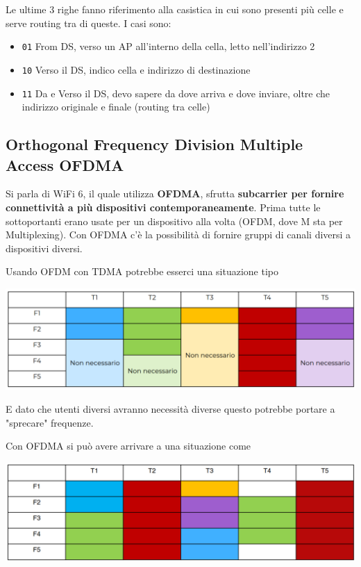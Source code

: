 Le ultime 3 righe fanno riferimento alla casistica in cui sono presenti più celle e serve routing tra di queste. I casi sono:
\begin{itemize}
	\item \texttt{01} From DS, verso un AP all'interno della cella, letto nell'indirizzo 2

	\item \texttt{10} Verso il DS, indico cella e indirizzo di destinazione

	\item \texttt{11} Da e Verso il DS, devo sapere da dove arriva e dove inviare, oltre che indirizzo originale e finale (routing tra celle)
\end{itemize}

\subsection{Orthogonal Frequency Division Multiple Access OFDMA}

Si parla di WiFi 6, il quale utilizza \textbf{OFDMA}, sfrutta \textbf{subcarrier per fornire connettività a più dispositivi contemporaneamente}. Prima tutte le sottoportanti erano usate per un dispositivo alla volta (OFDM, dove M sta per Multiplexing). Con OFDMA c'è la possibilità di fornire gruppi di canali diversi a dispositivi diversi. 

Usando OFDM con TDMA potrebbe esserci una situazione tipo
\begin{center}
	\includegraphics[width=0.75\linewidth]{img/wlan/tab1}
\end{center}
E dato che utenti diversi avranno necessità diverse questo potrebbe portare a "sprecare" frequenze. 

Con OFDMA si può avere arrivare a una situazione come
\begin{center}
	\includegraphics[width=0.75\linewidth]{img/wlan/tab2}
\end{center}

